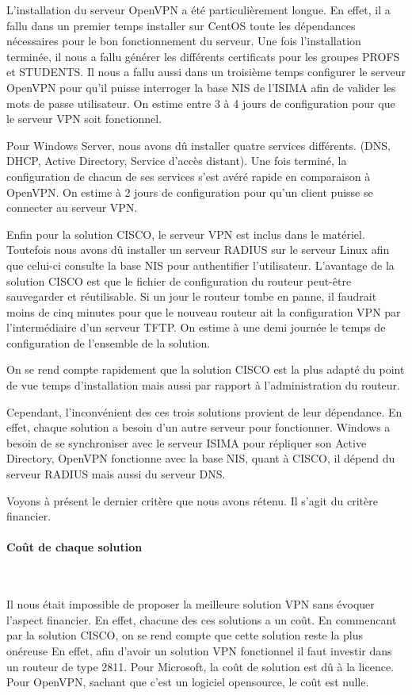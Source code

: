 L'installation du serveur OpenVPN a été particulièrement longue. En effet, il a fallu dans un premier temps installer sur CentOS toute les dépendances nécessaires pour le bon fonctionnement du serveur. Une fois l'installation terminée, il nous a fallu générer les différents certificats pour les groupes PROFS et STUDENTS. Il nous a fallu aussi dans un troisième temps configurer le serveur OpenVPN pour qu'il puisse interroger la base NIS de l'ISIMA afin de valider les mots de passe utilisateur.
On estime entre 3 à 4 jours de configuration pour que le serveur VPN soit fonctionnel.

Pour Windows Server, nous avons dû installer quatre services différents. (DNS, DHCP, Active Directory, Service d'accès distant). Une fois terminé, la configuration de chacun de ses services s'est avéré rapide en comparaison à OpenVPN.
On estime à 2 jours de configuration pour qu'un client puisse se connecter au serveur VPN.

Enfin pour la solution CISCO, le serveur VPN est inclus dans le matériel. Toutefois nous avons dû installer un serveur RADIUS sur le serveur Linux afin que celui-ci consulte la base NIS pour authentifier l'utilisateur. L'avantage de la solution CISCO est que le fichier de configuration du routeur peut-être sauvegarder et réutilisable. Si un jour le routeur tombe en panne, il faudrait moins de cinq minutes pour que le nouveau routeur ait la configuration VPN par l'intermédiaire d'un serveur TFTP.
On estime à une demi journée le temps de configuration de l'ensemble de la solution.


On se rend compte rapidement que la solution CISCO est la plus adapté du point de vue temps d'installation mais aussi par rapport à l'administration du routeur.

Cependant, l'inconvénient des ces trois solutions provient de leur dépendance. En effet, chaque solution a besoin d'un autre serveur pour fonctionner. Windows a besoin de se synchroniser avec le serveur ISIMA pour répliquer son Active Directory, OpenVPN fonctionne avec la base NIS, quant à CISCO, il dépend du serveur RADIUS mais aussi du serveur DNS.

Voyons à présent le dernier critère que nous avons rétenu. Il s'agit du critère financier. 

\paragraph{Coût de chaque solution}
~\

Il nous était impossible de proposer la meilleure solution VPN sans évoquer l'aspect financier. En effet, chacune des ces solutions a un coût. 
En commencant par la solution CISCO, on se rend compte que cette solution reste la plus onéreuse En effet, afin d'avoir un solution VPN fonctionnel il faut investir dans un routeur de type 2811. Pour Microsoft, la coût de  solution est dû à la licence. Pour OpenVPN, sachant que c'est un logiciel opensource, le coût est nulle. 

